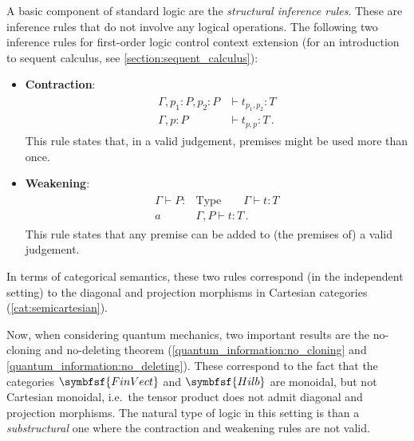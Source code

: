     A basic component of standard logic are the \textit{structural inference rules}. These are inference rules that do not involve any logical operations. The following two inference rules for first-order logic control context extension (for an introduction to sequent calculus, see \cref{section:sequent_calculus}):
    \begin{itemize}
        \item\textbf{Contraction}:
        \begin{gather}
            \begin{aligned}
                \Gamma,p_1:P,p_2:P &\vdash t_{p_1,p_2}:T\\
                \hline
                \Gamma,p:P &\vdash t_{p,p}:T\,.
            \end{aligned}
        \end{gather}
        This rule states that, in a valid judgement, premises might be used more than once.
        \item\textbf{Weakening}:
        \begin{gather}
            \begin{aligned}
                \Gamma\vdash P:&\mathrm{Type}\qquad\Gamma\vdash t:T\\
                \hline
                a&\Gamma,P\vdash t:T\,.
            \end{aligned}
        \end{gather}
        This rule states that any premise can be added to (the premises of) a valid judgement.
    \end{itemize}
    In terms of categorical semantics, these two rules correspond (in the independent setting) to the diagonal and projection morphisms in Cartesian categories (\cref{cat:semicartesian}).

    Now, when considering quantum mechanics, two important results are the no-cloning and no-deleting theorem (\cref{quantum_information:no_cloning} and \cref{quantum_information:no_deleting}). These correspond to the fact that the categories $\symbfsf{FinVect}$ and $\symbfsf{Hilb}$ are monoidal, but not Cartesian monoidal, i.e.~the tensor product does not admit diagonal and projection morphisms. The natural type of logic in this setting is than a \textit{substructural} one where the contraction and weakening rules are not valid.

